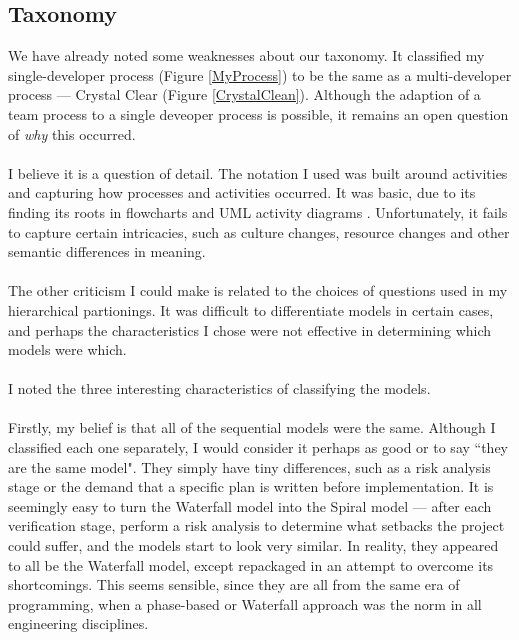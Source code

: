 \subsection{Taxonomy}
We have already noted some weaknesses about our taxonomy.
It classified my single-developer process (Figure \ref{MyProcess}) to be the same as a multi-developer
process --- Crystal Clear (Figure \ref{CrystalClean}).
Although the adaption of a team process to a single deveoper process is
possible, it remains an open question of {\em why} this occurred.\\
\\
I believe it is a question of detail.
The notation I used was built around activities and capturing how processes and
activities occurred.
It was basic, due to its finding its roots in flowcharts and UML activity
diagrams \cite{Dumas01umlactivity, BellUMLBasics}.
Unfortunately, it fails to capture certain intricacies, such as culture changes,
resource changes and other semantic differences in meaning.\\
\\
The other criticism I could make is related to the choices of questions used in
my hierarchical partionings.
It was difficult to differentiate models in certain cases, and perhaps the
characteristics I chose were not effective in determining which models were
which.\\
\\
I noted the three interesting characteristics of classifying the models.\\
\\
Firstly, my belief is that all of the sequential models were the same.
Although I classified each one separately, I would consider it perhaps as good
or to say ``they are the same model".
They simply have tiny differences, such as a risk analysis stage or the demand
that a specific plan is written before implementation.
It is seemingly easy to turn the Waterfall model into the Spiral model ---
after each verification stage, perform a risk analysis to determine what
setbacks the project could suffer, and the models start to look very similar.
In reality, they appeared to all be the Waterfall model, except repackaged in an
attempt to overcome its shortcomings.
This seems sensible, since they are all from the same era of programming, when a
phase-based or Waterfall approach was the norm in all engineering disciplines.

\pagebreak

